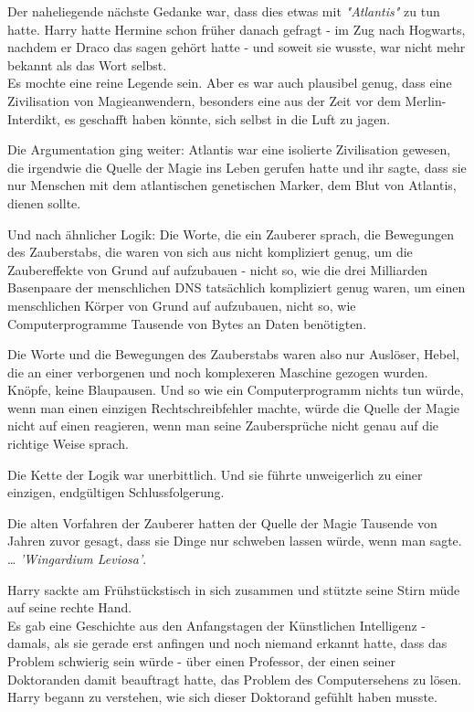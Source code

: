 {Der naheliegende nächste Gedanke war, dass dies etwas mit \emph{"Atlantis"} zu tun hatte. Harry hatte Hermine schon früher danach gefragt - im Zug nach Hogwarts, nachdem er Draco das sagen gehört hatte - und soweit sie wusste, war nicht mehr bekannt als das Wort selbst.\\ Es mochte eine reine Legende sein. Aber es war auch plausibel genug, dass eine Zivilisation von Magieanwendern, besonders eine aus der Zeit vor dem Merlin-Interdikt, es geschafft haben könnte, sich selbst in die Luft zu jagen.

Die Argumentation ging weiter: Atlantis war eine isolierte Zivilisation gewesen, die irgendwie die Quelle der Magie ins Leben gerufen hatte und ihr sagte, dass sie nur Menschen mit dem atlantischen genetischen Marker, dem Blut von Atlantis, dienen sollte.

Und nach ähnlicher Logik: Die Worte, die ein Zauberer sprach, die Bewegungen des Zauberstabs, die waren von sich aus nicht kompliziert genug, um die Zaubereffekte von Grund auf aufzubauen - nicht so, wie die drei Milliarden Basenpaare der menschlichen DNS tatsächlich kompliziert genug waren, um einen menschlichen Körper von Grund auf aufzubauen, nicht so, wie Computerprogramme Tausende von Bytes an Daten benötigten.

Die Worte und die Bewegungen des Zauberstabs waren also nur Auslöser, Hebel, die an einer verborgenen und noch komplexeren Maschine gezogen wurden.\\ Knöpfe, keine Blaupausen. Und so wie ein Computerprogramm nichts tun würde, wenn man einen einzigen Rechtschreibfehler machte, würde die Quelle der Magie nicht auf einen reagieren, wenn man seine Zaubersprüche nicht genau auf die richtige Weise sprach.

Die Kette der Logik war unerbittlich. Und sie führte unweigerlich zu einer einzigen, endgültigen Schlussfolgerung.

Die alten Vorfahren der Zauberer hatten der Quelle der Magie Tausende von Jahren zuvor gesagt, dass sie Dinge nur schweben lassen würde, wenn man sagte.\\ … \emph{'Wingardium Leviosa'}.

Harry sackte am Frühstückstisch in sich zusammen und stützte seine Stirn müde auf seine rechte Hand.\\ Es gab eine Geschichte aus den Anfangstagen der Künstlichen Intelligenz - damals, als sie gerade erst anfingen und noch niemand erkannt hatte, dass das Problem schwierig sein würde - über einen Professor, der einen seiner Doktoranden damit beauftragt hatte, das Problem des Computersehens zu lösen.\\ Harry begann zu verstehen, wie sich dieser Doktorand gefühlt haben musste.

}
